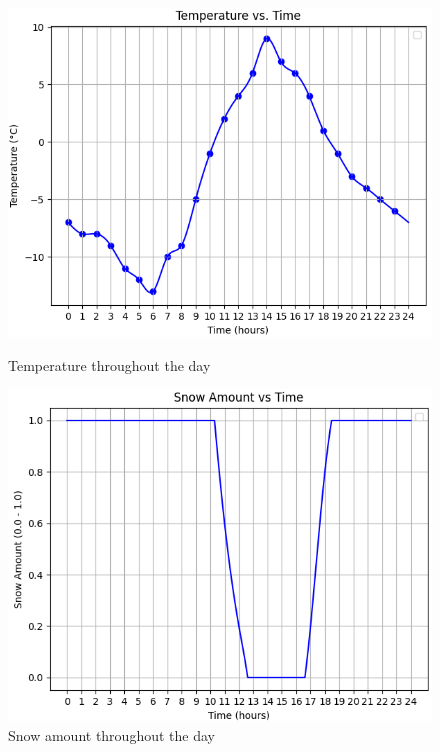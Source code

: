 \documentclass{article}
\begin{document}
\begin{itemize}

\begin{figure}[h]
  \centering
  \begin{minipage}{0.45\textwidth}
      \centering
      \includegraphics[width=\textwidth]{images/Temperature35N.png}
      \caption{Temperature throughout the day}
      \label{fig:Temperature35N}
  \end{minipage}\hfill
  \begin{minipage}{0.45\textwidth}
      \centering
      \includegraphics[width=\textwidth]{images/SnowAmount35N.png}
      \caption{Snow amount throughout the day}
      \label{fig:SnowAmount35N}
  \end{minipage}
\end{figure}


\end{itemize}
\end{document}
